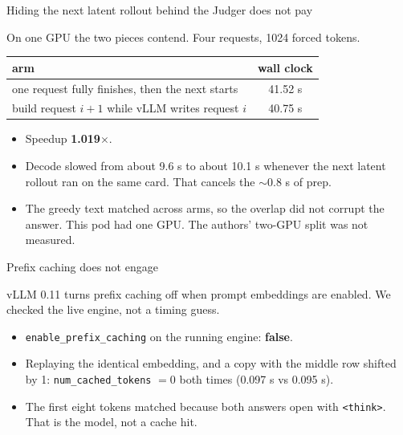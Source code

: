 \documentclass[aspectratio=169]{beamer}
\begin{document}
\begin{frame}{Hiding the next latent rollout behind the Judger does not pay}

On one GPU the two pieces contend. Four requests, 1024 forced tokens.

\begin{center}
\begin{tabular}{lc}
\toprule
arm & wall clock \\
\midrule
one request fully finishes, then the next starts & 41.52 s \\
build request $i{+}1$ while vLLM writes request $i$ & 40.75 s \\
\bottomrule
\end{tabular}
\end{center}

\vspace{0.4em}
\begin{itemize}
  \item Speedup \textbf{1.019$\times$}.
  \item Decode slowed from about 9.6 s to about 10.1 s whenever the next
        latent rollout ran on the same card. That cancels the $\sim$0.8 s
        of prep.
  \item The greedy text matched across arms, so the overlap did not corrupt
        the answer. This pod had one GPU. The authors' two-GPU split was
        not measured.
\end{itemize}

\end{frame}

\begin{frame}{Prefix caching does not engage}

vLLM 0.11 turns prefix caching off when prompt embeddings are enabled.
We checked the live engine, not a timing guess.

\begin{itemize}
  \item \texttt{enable\_prefix\_caching} on the running engine: \textbf{false}.
  \item Replaying the identical embedding, and a copy with the middle row
        shifted by 1: \texttt{num\_cached\_tokens} $= 0$ both times
        (0.097 s vs 0.095 s).
  \item The first eight tokens matched because both answers open with
        \texttt{<think>}. That is the model, not a cache hit.
\end{itemize}

\end{frame}
\end{document}
